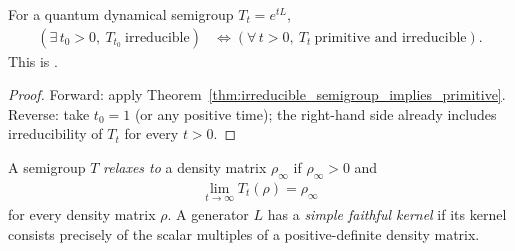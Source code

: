 \begin{theorem}
    \label{thm:qds_irreducible_iff_primitive}
    \leanok
    For a quantum dynamical semigroup $T_t=e^{tL}$,
    \begin{align}
        (\exists\, t_0>0,\ T_{t_0}\ \text{irreducible})
        &\iff
        (\forall\, t>0,\ T_t\ \text{primitive and irreducible}).
        \label{eq:semigroup_qds_equiv}
    \end{align}
    This is \cite[Proposition~7.5]{Wolf2012Quantum}.
\end{theorem}

\begin{proof}\leanok
    Forward: apply Theorem~\ref{thm:irreducible_semigroup_implies_primitive}.
    Reverse: take $t_0=1$ (or any positive time); the right-hand side
    already includes irreducibility of $T_t$ for every $t>0$.
\end{proof}

\begin{definition}
    \label{def:qds_faithful_relaxation}
    \leanok
    A semigroup $T$ \emph{relaxes to} a density matrix $\rho_\infty$ if
    $\rho_\infty>0$ and
    \begin{align}
        \lim_{t\to\infty}T_t(\rho)=\rho_\infty
        \label{eq:qds_faithful_relaxation}
    \end{align}
    for every density matrix $\rho$.  A generator $L$ has a \emph{simple
    faithful kernel} if its kernel consists precisely of the scalar multiples
    of a positive-definite density matrix.
\end{definition}

